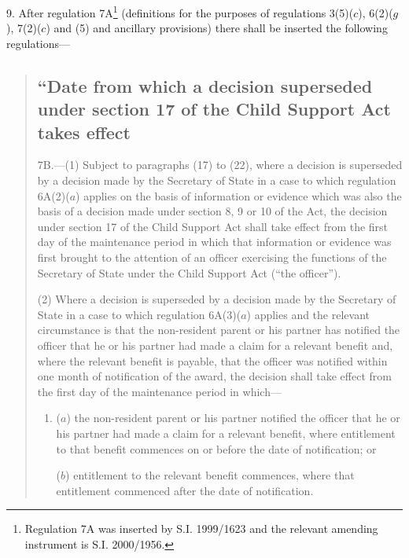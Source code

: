 \documentclass[12pt,a4paper]{article}
\begin{document}
9.  After regulation 7A\footnote{\frenchspacing Regulation 7A was inserted by S.I. 1999/1623 and the relevant amending instrument is S.I. 2000/1956.} (definitions for the purposes of regulations 3(5)($c$), 6(2)($g$), 7(2)($c$)  and (5) and ancillary provisions) there shall be inserted the following regulations—
\begin{quotation}
\subsection*{“Date from which a decision superseded under section 17 of the Child Support Act takes effect}

7B.---(1)  Subject to paragraphs (17) to (22), where a decision is superseded by a decision made by the Secretary of State in a case to which regulation 6A(2)($a$)  applies on the basis of information or evidence which was also the basis of a decision made under section 8, 9 or 10 of the Act, the decision under section 17 of the Child Support Act shall take effect from the first day of the maintenance period in which that information or evidence was first brought to the attention of an officer exercising the functions of the Secretary of State under the Child Support Act (“the officer”).

(2) Where a decision is superseded by a decision made by the Secretary of State in a case to which regulation 6A(3)($a$)  applies and the relevant circumstance is that the non-resident parent or his partner has notified the officer that he or his partner had made a claim for a relevant benefit and, where the relevant benefit is payable, that the officer was notified within one month of notification of the award, the decision shall take effect from the first day of the maintenance period in which—
\begin{enumerate}\item[]
($a$) the non-resident parent or his partner notified the officer that he or his partner had made a claim for a relevant benefit, where entitlement to that benefit commences on or before the date of notification; or

($b$) entitlement to the relevant benefit commences, where that entitlement commenced after the date of notification.
\end{enumerate}

\pagebreak[3]


\end{quotation}
\end{document}
